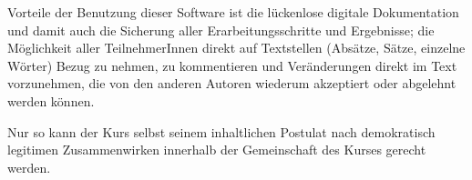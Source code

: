 \documentclass[11pt,a4paper,oneside]{article}
\begin{document}
Vorteile der Benutzung dieser Software ist die lückenlose digitale Dokumentation und damit auch die Sicherung aller Erarbeitungsschritte und Ergebnisse; die Möglichkeit aller TeilnehmerInnen direkt auf Textstellen (Absätze, Sätze, einzelne Wörter) Bezug zu nehmen, zu kommentieren und Veränderungen direkt im Text vorzunehmen, die von den anderen Autoren wiederum akzeptiert oder abgelehnt werden können.

Nur so kann der Kurs selbst seinem inhaltlichen Postulat nach demokratisch legitimen Zusammenwirken innerhalb der Gemeinschaft des Kurses gerecht werden.


\printbibliography
\end{document}
